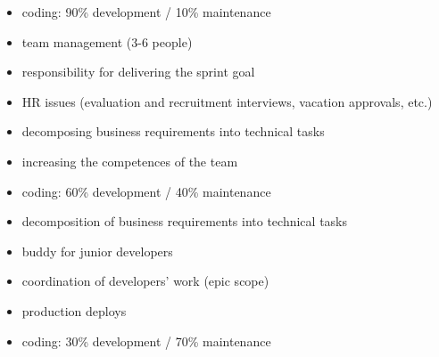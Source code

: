 \documentclass{my_cv}
\begin{document}
\begin{adjustwidth}{2em}{0em}

\begin{flushleft}{}\end{flushleft}
\begin{itemize}
    \item coding: 90\% development / 10\% maintenance
    \item team management (3-6 people)
    \item responsibility for delivering the sprint goal
    \item HR issues (evaluation and recruitment interviews, vacation approvals, etc.)
    \item decomposing business requirements into technical tasks
    \item increasing the competences of the team
\end{itemize}
\vspace{0.5em}

\begin{flushleft}{}\end{flushleft}
\begin{itemize}
    \item coding: 60\% development / 40\% maintenance
    \item decomposition of business requirements into technical tasks
    \item buddy for junior developers
    \item coordination of developers' work (epic scope)
    \item production deploys
\end{itemize}
\vspace{0.5em}

\begin{flushleft}{}\end{flushleft}
\begin{itemize}
    \item coding: 30\% development / 70\% maintenance
\end{itemize}
\vspace{0.5em}


\end{adjustwidth}
\end{document}

